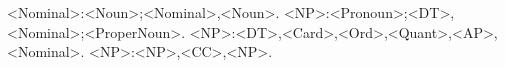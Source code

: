 <Nominal>:<Noun>;<Nominal>,<Noun>.
<NP>:<Pronoun>;<DT>,<Nominal>;<ProperNoun>.
<NP>:<DT>,<Card>,<Ord>,<Quant>,<AP>,<Nominal>.
<NP>:<NP>,<CC>,<NP>.